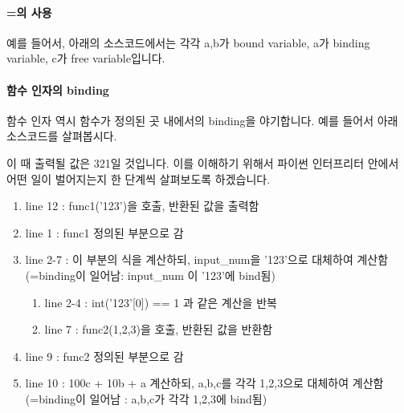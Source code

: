 \documentclass[titlepage]{report}
\begin{document}


\paragraph{=의 사용} 

예를 들어서, 아래의 소스코드에서는 각각 a,b가 bound variable, a가 binding variable, c가 free variable입니다. 


\paragraph{함수 인자의 binding} 

함수 인자 역시 함수가 정의된 곳 내에서의 binding을 야기합니다. 예를 들어서 아래 소스코드를 살펴봅시다. 


                
이 때 출력될 값은 321일 것입니다. 이를 이해하기 위해서 파이썬 인터프리터 안에서 어떤 일이 벌어지는지 한 단계씩 살펴보도록 하겠습니다. 

\begin{enumerate} 
\item line 12 : func1('123')을 호출, 반환된 값을 출력함
\item line 1 : func1 정의된 부분으로 감
\item line 2-7 : 이 부분의 식을 계산하되, input\_num을 '123'으로 대체하여 계산함 (=binding이 일어남: input\_num 이 '123'에 bind됨)
\begin{enumerate}
\item line 2-4 : int('123'[0]) == 1 과 같은 계산을 반복 
\item line 7 : func2(1,2,3)을 호출, 반환된 값을 반환함
\end{enumerate}
\item line 9 : func2 정의된 부분으로 감 
\item line 10 : 100c + 10b + a 계산하되, a,b,c를 각각 1,2,3으로 대체하여 계산함 (=binding이 일어남 : a,b,c가 각각 1,2,3에 bind됨)
\end{enumerate}

\end{document}
